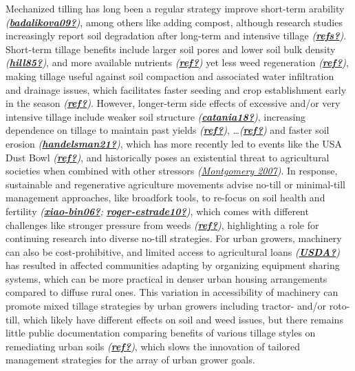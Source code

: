 \documentclass[
]{article}
\begin{document}
Mechanized tilling has long been a regular strategy improve short-term arability \emph{(\protect\hyperlink{ref-badalikova09}{\textbf{badalikova09?}})}, among others like adding compost, although research studies increasingly report soil degradation after long-term and intensive tillage \emph{(\protect\hyperlink{ref-refs}{\textbf{refs?}})}.
Short-term tillage benefits include larger soil pores and lower soil bulk density \emph{(\protect\hyperlink{ref-hill85}{\textbf{hill85?}})}, and more available nutrients \emph{(\protect\hyperlink{ref-ref}{\textbf{ref?}})} yet less weed regeneration \emph{(\protect\hyperlink{ref-ref}{\textbf{ref?}})}, making tillage useful against soil compaction and associated water infiltration and drainage issues, which facilitates faster seeding and crop establishment early in the season \emph{(\protect\hyperlink{ref-ref}{\textbf{ref?}})}.
However, longer-term side effects of excessive and/or very intensive tillage include weaker soil structure \emph{(\protect\hyperlink{ref-catania18}{\textbf{catania18?}})}, increasing dependence on tillage to maintain past yields \emph{(\protect\hyperlink{ref-ref}{\textbf{ref?}})}, \ldots{}\emph{(\protect\hyperlink{ref-ref}{\textbf{ref?}})} and faster soil erosion \emph{(\protect\hyperlink{ref-handelsman21}{\textbf{handelsman21?}})}, which has more recently led to events like the USA Dust Bowl \emph{(\protect\hyperlink{ref-ref}{\textbf{ref?}})}, and historically poses an existential threat to agricultural societies when combined with other stressors \emph{(\protect\hyperlink{ref-montgomery07}{Montgomery 2007})}.
In response, sustainable and regenerative agriculture movements advise no-till or minimal-till management approaches, like broadfork tools, to re-focus on soil health and fertility \emph{(\protect\hyperlink{ref-xiao-bin06}{\textbf{xiao-bin06?}}; \protect\hyperlink{ref-roger-estrade10}{\textbf{roger-estrade10?}})}, which comes with different challenges like stronger pressure from weeds \emph{(\protect\hyperlink{ref-ref}{\textbf{ref?}})}, highlighting a role for continuing research into diverse no-till strategies.
For urban growers, machinery can also be cost-prohibitive, and limited access to agricultural loans \emph{(\protect\hyperlink{ref-USDA}{\textbf{USDA?}})} has resulted in affected communities adapting by organizing equipment sharing systems, which can be more practical in denser urban housing arrangements compared to diffuse rural ones.
This variation in accessibility of machinery can promote mixed tillage strategies by urban growers including tractor- and/or roto-till, which likely have different effects on soil and weed issues, but there remains little public documentation comparing benefits of various tillage styles on remediating urban soils \emph{(\protect\hyperlink{ref-ref}{\textbf{ref?}})}, which slows the innovation of tailored management strategies for the array of urban grower goals.
\end{document}

